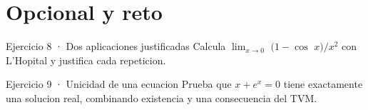 \documentclass[10pt,a4paper,oneside,openany]{book}
\begin{document}
\section*{Opcional y reto}
\begin{PSevenOptionalFixed}{Ejercicio 8 · Dos aplicaciones justificadas}
Calcula \(\lim_{x\to 0}\) \((1-\cos\) \(x)/x^{2}\) con L'Hopital y justifica cada repeticion.
\end{PSevenOptionalFixed}
\begin{PSevenOptionalFixed}{Ejercicio 9 · Unicidad de una ecuacion}
Prueba que \(x+e^x=0\) tiene exactamente una solucion real, combinando existencia y una consecuencia del TVM.
\end{PSevenOptionalFixed}
\end{document}
